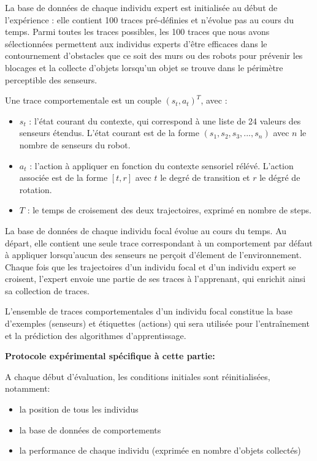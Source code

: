 \documentclass[a4paper, 12pt]{report}
\begin{document}
	La base de données de chaque individu expert est initialisée au début de l'expérience : elle contient 100 traces pré-définies et n'évolue pas au cours du temps. Parmi toutes les traces possibles, les 100 traces que nous avons sélectionnées permettent aux individus experts d'être efficaces dans le contournement d'obstacles que ce soit des murs ou des robots pour prévenir les blocages et la collecte d'objets lorsqu'un objet se trouve dans le périmètre perceptible des senseurs.
	
	Une trace comportementale est un couple $( s_t, a_t )^T$, avec :
	\begin{itemize}
	\item $s_t$ : l'état courant du contexte, qui correspond à une liste de 24 valeurs des senseurs étendus. L'état courant est de la forme 
    $(s_1, s_2, s_3, ..., s_n)$ avec $n$ le nombre de senseurs du robot. 
	\item $a_t$ : l'action à appliquer en fonction du contexte sensoriel rélévé. L'action associée est de la forme $[t,r]$ avec $t$ le degré de transition et $r$ le dégré de rotation.
	\item $T$ : le temps de croisement des deux trajectoires, exprimé en nombre de steps. 
	\end{itemize}


	La base de données de chaque individu focal évolue au cours du temps. Au départ, elle contient une seule trace correspondant à un comportement par défaut à appliquer lorsqu'aucun des senseurs ne perçoit d'élement de l'environnement. Chaque fois que les trajectoires d'un individu focal et d'un individu expert se croisent, l'expert envoie une partie de ses traces à l'apprenant, qui enrichit ainsi sa collection de traces.
	
    L'ensemble de traces comportementales d'un individu focal constitue la base d'exemples (senseurs) et étiquettes (actions) qui sera utilisée pour l'entraînement et la prédiction des algorithmes d'apprentissage.
    
    \:
    
    \textbf{Protocole expérimental spécifique à cette partie:} 
    
    A chaque début d'évaluation, les conditions initiales sont réinitialisées, notamment:
    \begin{itemize}
	\item la position de tous les individus
    \item la base de données de comportements
    \item la performance de chaque individu (exprimée en nombre d'objets collectés)
	\end{itemize}
    
\end{document}

